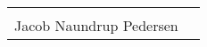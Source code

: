 


\vfill

\begin{table}[H]
	\centering
		\begin{tabular}{c c }
			\underline{\phantom{mmmmmmmmmmmmmmmmmmm}}       \\
			Jacob Naundrup Pedersen \\
		\end{tabular}
		
\end{table}

